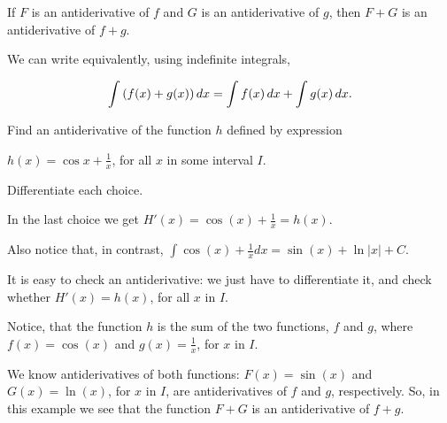 \documentclass{ximera}
\begin{document}
\begin{theorem}\label{theorem:SRA}
If $F$ is an antiderivative of $f$ and $G$ is an antiderivative of
$g$, then $F+G$ is an antiderivative of $f+g$.

We can write equivalently, using indefinite integrals, 

\[\int \left(f(x)+g(x)\right) \mathop{}\!d x= \int f(x)\mathop{}\!d x +\int g(x) \mathop{}\!d x.\]
\end{theorem}

\begin{example}
  Find  an antiderivative of the function $h$ defined by expression
  
   $h(x)=\cos{x}+\frac{1}{x}$, for all $x$ in some interval $I$.
  \begin{multipleChoice}
  \end{multipleChoice}
  \begin{feedback}
    Differentiate each choice.
    
     In the last choice we get $H'(x)=\cos(x)+\frac{1}{x}=h(x)$.
     
     Also notice that, in contrast, $\int\cos(x)+\frac{1}{x}dx=\sin(x)+\ln|x|+C$.
  \end{feedback}
\end{example}
It is easy to check an antiderivative: we just have to differentiate it, and check whether $H'(x)=h(x)$, for all $x$ in $I$.

Notice, that the function $h$ is the sum of the two functions, $f$ and $g$, where $f(x)=\cos(x)$ and $g(x)=\frac{1}{x}$, for $x$ in $I$.

We know antiderivatives of both functions:  $F(x)=\sin(x)$ and $G(x)=\ln(x)$,  for $x$ in $I$, are antiderivatives of $f$ and $g$, respectively.
So, in this example we see that the function  $F+G$ is an antiderivative of $f+g$.


%
%
%
%     
\end{document}

